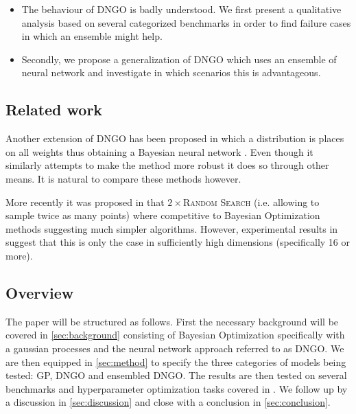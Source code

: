 \documentclass[conference,compsoc]{IEEEtran}
\theoremstyle{definition}
\begin{document}
        \begin{itemize}
            \item The behaviour of DNGO is badly understood.
             We first present a qualitative analysis based on several categorized benchmarks in order to find failure cases in which an ensemble might help.
            \item Secondly, we propose a generalization of DNGO which uses an ensemble of neural network and investigate in which scenarios this is advantageous.
        \end{itemize}


    \subsection{Related work}

        Another extension of DNGO has been proposed in which a distribution is places on all weights thus obtaining a Bayesian neural network \parencite{springenberg_bayesian_2016}.
        Even though it similarly attempts to make the method more robust it does so through other means.
        It is natural to compare these methods however.

        More recently it was proposed in \parencite{li_hyperband:_2016} that $2\times$\textsc{Random Search} (i.e. allowing to sample twice as many points) where competitive to Bayesian Optimization methods suggesting much simpler algorithms.
        However, experimental results in \parencite{golovin_google_2017} suggest that this is only the case in sufficiently high dimensions (specifically 16 or more).

    \subsection{Overview}

        The paper will be structured as follows.
        First the necessary background will be covered in \cref{sec:background} consisting of Bayesian Optimization specifically with a gaussian processes and the neural network approach referred to as DNGO.
        We are then equipped in \cref{sec:method} to specify the three categories of models being tested: GP, DNGO and ensembled DNGO.
        The results are then tested on several benchmarks and hyperparameter optimization tasks covered in . We follow up by a discussion in \cref{sec:discussion} and close with a conclusion in \cref{sec:conclusion}.
\end{document}
